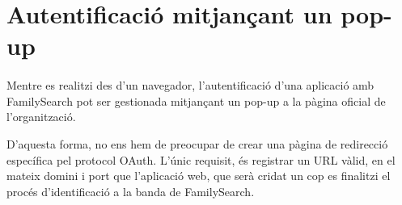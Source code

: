 \section{Autentificació mitjançant un pop-up}

    \paragraph{}
    Mentre es realitzi des d'un navegador, l'autentificació d’una aplicació amb FamilySearch pot ser gestionada mitjançant un pop-up a la pàgina oficial de l’organització.

    D'aquesta forma, no ens hem de preocupar de crear una pàgina de redirecció específica pel protocol OAuth. L'únic requisit, és registrar un URL vàlid, en el mateix domini i port que l’aplicació web, que serà cridat un cop es finalitzi el procés d'identificació a la banda de FamilySearch.
